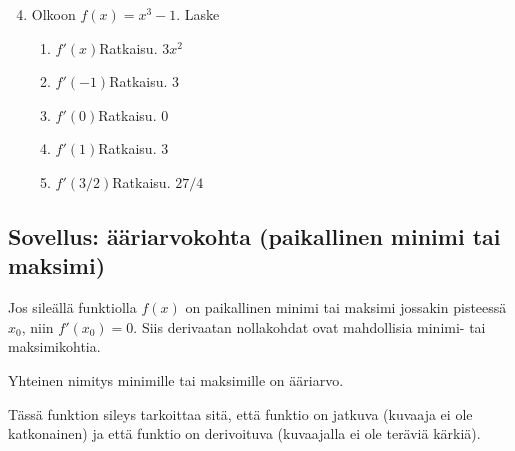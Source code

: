 \documentclass[10pt]{article}
\newcommand{\ratkaisu}[1]{\hfill{\color{blue}\quad\textrm{Ratkaisu. } #1}}
\begin{document}
\newpage

\begin{multicols}{2}
\def\px{1}
\def\py{2}
\def\qx{4}
\def\qy{3}
\vfill\null
\columnbreak
\begin{enumerate}
\setcounter{enumi}{3}
\item Olkoon $f(x)=x^3-1$. Laske
\begin{enumerate}
\item $f'(x)$\ratkaisu{$3x^2$}
\item $f'(-1)$\ratkaisu{$3$}
\item $f'(0)$\ratkaisu{$0$}
\item $f'(1)$\ratkaisu{$3$}
\item $f'(3/2)$\ratkaisu{$27/4$}
\end{enumerate}
\end{enumerate}
\end{multicols}

\subsection{Sovellus: ääriarvokohta (paikallinen minimi tai maksimi)}

Jos sileällä funktiolla $f(x)$ on paikallinen minimi tai maksimi jossakin pisteessä $x_0$, niin $f'(x_0)=0$. Siis derivaatan nollakohdat ovat mahdollisia minimi- tai maksimikohtia.

Yhteinen nimitys minimille tai maksimille on ääriarvo.


Tässä funktion sileys tarkoittaa sitä, että funktio on jatkuva (kuvaaja ei ole katkonainen) ja että funktio on derivoituva (kuvaajalla ei ole teräviä kärkiä).\\
\end{document}
